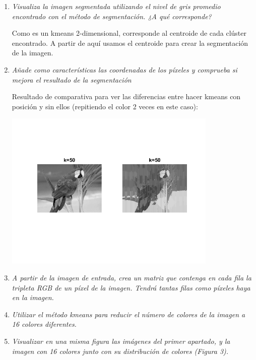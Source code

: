 \documentclass{article}
\begin{document}
\begin{enumerate}
\begin{enumerate}
 \item \textit{Visualiza  la  imagen  segmentada  utilizando  el  nivel  de  gris  promedio 
encontrado con el método de segmentación. ¿A qué corresponde?}

 Como es un kmeans 2-dimensional, corresponde al centroide de cada clúster encontrado. A partir de aquí usamos el centroide para crear la segmentación de la imagen.

 \item \textit{Añade como características las coordenadas de los píxeles y comprueba si 
mejora el resultado de la segmentación}
  
	Resultado de comparativa para ver las diferencias entre hacer kmeans con posición y sin ellos (repitiendo el color 2 veces en este caso):
	
	\begin{center}
		\includegraphics[width=0.8\textwidth]{ej33-loroGray.png}
	\end{center}
	
  \item \textit{A partir de la imagen de entrada, crea un matriz que contenga en cada fila la tripleta RGB de un píxel de la imagen. Tendrá tantas filas como píxeles 
haya en la imagen.}

 \item \textit{Utilizar el método kmeans para reducir el número de colores de la imagen 
a 16 colores diferentes.}
 
 \item \textit{Visualizar  en  una  misma  figura  las  imágenes  del  primer  apartado,  y  la imagen con 16 colores junto con su distribución de colores (Figura 3).}


\end{enumerate}
\end{enumerate}
\end{document}
